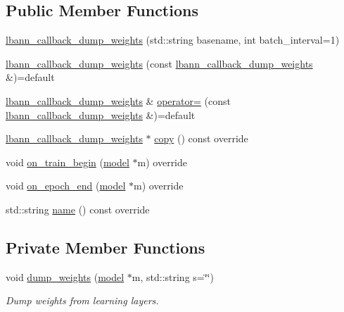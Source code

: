 \subsection*{Public Member Functions}
\begin{DoxyCompactItemize}
\item 
\hyperlink{classlbann_1_1lbann__callback__dump__weights_a6ad86c6dec233324f013e9d83e574267}{lbann\+\_\+callback\+\_\+dump\+\_\+weights} (std\+::string basename, int batch\+\_\+interval=1)
\item 
\hyperlink{classlbann_1_1lbann__callback__dump__weights_aeae4724a0e8f9129d76d6822205d854f}{lbann\+\_\+callback\+\_\+dump\+\_\+weights} (const \hyperlink{classlbann_1_1lbann__callback__dump__weights}{lbann\+\_\+callback\+\_\+dump\+\_\+weights} \&)=default
\item 
\hyperlink{classlbann_1_1lbann__callback__dump__weights}{lbann\+\_\+callback\+\_\+dump\+\_\+weights} \& \hyperlink{classlbann_1_1lbann__callback__dump__weights_a6f4608e843c2d33e1082498ba34dd8e0}{operator=} (const \hyperlink{classlbann_1_1lbann__callback__dump__weights}{lbann\+\_\+callback\+\_\+dump\+\_\+weights} \&)=default
\item 
\hyperlink{classlbann_1_1lbann__callback__dump__weights}{lbann\+\_\+callback\+\_\+dump\+\_\+weights} $\ast$ \hyperlink{classlbann_1_1lbann__callback__dump__weights_a5e3d078ea54f8768e23aac2393b1bc3c}{copy} () const override
\item 
void \hyperlink{classlbann_1_1lbann__callback__dump__weights_a46db01d535414a0965caae709a08a150}{on\+\_\+train\+\_\+begin} (\hyperlink{classlbann_1_1model}{model} $\ast$m) override
\item 
void \hyperlink{classlbann_1_1lbann__callback__dump__weights_aa73068d94b2408fc0124b2a05b4e2b8a}{on\+\_\+epoch\+\_\+end} (\hyperlink{classlbann_1_1model}{model} $\ast$m) override
\item 
std\+::string \hyperlink{classlbann_1_1lbann__callback__dump__weights_ae6c0fee627651edaff778b1fd4b0e0c4}{name} () const override
\end{DoxyCompactItemize}
\subsection*{Private Member Functions}
\begin{DoxyCompactItemize}
\item 
void \hyperlink{classlbann_1_1lbann__callback__dump__weights_a5902fb87255b410a5d777ea385813416}{dump\+\_\+weights} (\hyperlink{classlbann_1_1model}{model} $\ast$m, std\+::string s=\char`\"{}\char`\"{})
\begin{DoxyCompactList}\small\item\em Dump weights from learning layers. \end{DoxyCompactList}\end{DoxyCompactItemize}

